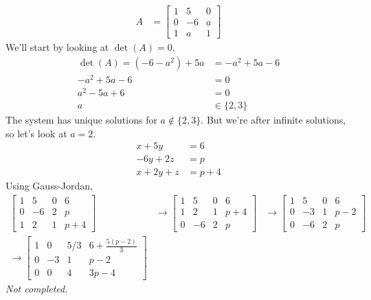 \documentclass[a4paper,norsk,12pt]{article}
\begin{document}
\begin{align*}
  A &=
  \left[
    \begin{array}{rrr}
      1 &  5 &  0 \\
      0 & -6 &  a \\
      1 &  a &  1
    \end{array}
  \right]
\end{align*}
We'll start by looking at $\det{(A)}= 0$,
\begin{align*}
  \det{(A)} = (-6-a^2) +5a &= -a^2+5a-6 \\
  -a^2+5a-6 &= 0 \\
   a^2-5a+6 &= 0 \\
  a & \in \{2, 3\}
\end{align*}
The system has unique solutions for $a \notin \{2, 3\}$. But we're after infinite
solutions, so let's look at $a=2$.
\begin{align*}
      x + 5y &= 6 \\
    -6y + 2z &= p \\
  x + 2y + z &= p + 4
\end{align*}
Using Gauss-Jordan,
\begin{align*}
  \left[
    \begin{array}{rrr|r}
      1 &  5 &  0 & 6 \\
      0 & -6 &  2 & p \\
      1 &  2 &  1 & p+4
    \end{array}
  \right]
  & \rightarrow
  \left[
    \begin{array}{rrr|r}
      1 &  5 &  0 & 6 \\
      1 &  2 &  1 & p+4 \\
      0 & -6 &  2 & p
    \end{array}
  \right]
  & \rightarrow
  \left[
    \begin{array}{rrr|r}
      1 &  5 &  0 & 6 \\
      0 & -3 &  1 & p-2 \\
      0 & -6 &  2 & p
    \end{array}
  \right]
  \\
  \rightarrow
  \left[
    \begin{array}{rrr|r}
      1 &  0 &  5/3 & 6+\frac{5(p-2)}{3} \\
      0 & -3 &  1 & p-2 \\
      0 &  0 &  4 & 3p-4
    \end{array}
  \right]
\end{align*}
\textit{Not completed.}
\end{document}
